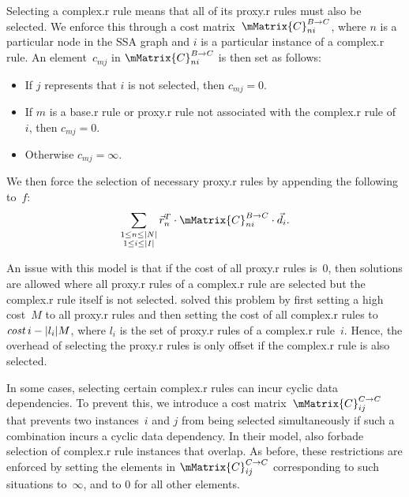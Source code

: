 Selecting a \gls{complex.r} \gls{rule} means that all of its \gls{proxy.r}
\glspl{rule} must also be selected.
%
We enforce this through a cost matrix~$\mMatrix{C}_{ni}^{\mCategory{B}
  \rightarrow \mCategory{C}}$, where $n$ is a particular \gls{node} in the
\gls{SSA graph} and $i$ is a particular instance of a \gls{complex.r}
\gls{rule}.
%
An element~$c_{mj}$ in $\mMatrix{C}_{ni}^{\mCategory{B} \rightarrow
  \mCategory{C}}$ is then set as follows:
%
\begin{itemize}
  \item If $j$ represents that $i$ is not selected, then \mbox{$c_{mj} = 0$}.
  \item If $m$ is a \gls{base.r} \gls{rule} or \gls{proxy.r} \gls{rule} not
    associated with the \gls{complex.r} \gls{rule} of~$i$, then \mbox{$c_{mj} =
      0$}.
  \item Otherwise \mbox{$c_{mj} = \infty$}.
\end{itemize}
%
We then force the selection of necessary \gls{proxy.r} \glspl{rule} by appending
the following to~$f$:
%
\begin{displaymath}
  \sum_{\substack{1 \leq n \leq |N|\\1 \leq i \leq |I|}}
    \mVector{r}_n^T \cdot
    \mMatrix{C}_{ni}^{\mCategory{B} \rightarrow \mCategory{C}} \cdot \mVector{d}_i.
\end{displaymath}

An issue with this model is that if the cost of all \gls{proxy.r} \glspl{rule}
is~0, then solutions are allowed where all \gls{proxy.r} \glspl{rule} of a
\gls{complex.r} \gls{rule} are selected but the \gls{complex.r} \gls{rule}
itself is not selected.
%
\citeauthor{EbnerEtAl:2008} solved this problem by first setting a high cost~$M$ to
all \gls{proxy.r} \glspl{rule} and then setting the cost of all \gls{complex.r}
\glspl{rule} to \mbox{$\operatorname{\textrm{\textit{cost}}}{i} - |l_i|M$}, where $l_i$ is the set of
\gls{proxy.r} \glspl{rule} of a \gls{complex.r} \gls{rule}~$i$.
%
Hence, the overhead of selecting the \gls{proxy.r} \glspl{rule} is only offset
if the \gls{complex.r} \gls{rule} is also selected.

In some cases, selecting certain \gls{complex.r} \glspl{rule} can incur cyclic
data dependencies.
%
To prevent this, we introduce a cost matrix~$\mMatrix{C}_{ij}^{\mCategory{C}
  \rightarrow \mCategory{C}}$ that prevents two instances~$i$ and $j$ from being
selected simultaneously if such a combination incurs a cyclic data dependency.
%
In their model, \citeauthor{EbnerEtAl:2008} also forbade selection of \gls{complex.r}
\gls{rule} instances that overlap.
%
As before, these restrictions are enforced by setting the elements in
$\mMatrix{C}_{ij}^{\mCategory{C} \rightarrow \mCategory{C}}$ corresponding to
such situations to~$\infty$, and to 0 for all other elements.

